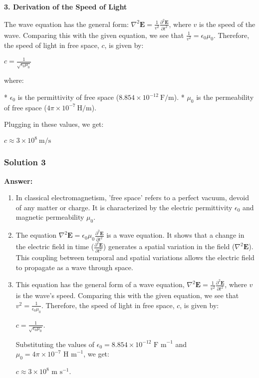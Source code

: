 \documentclass{article}
\begin{document}
\textbf{3. Derivation of the Speed of Light}

The wave equation has the general form: $\nabla^2 \mathbf{E} = \frac{1}{v^2} \frac{\partial^2 \mathbf{E}}{\partial t^2}$, where $v$ is the speed of the wave. Comparing this with the given equation, we see that $\frac{1}{v^2} = \epsilon_0 \mu_0$. Therefore, the speed of light in free space, $c$, is given by:

$c = \frac{1}{\sqrt{\epsilon_0 \mu_0}}$

where:

* $\epsilon_0$ is the permittivity of free space ($8.854 \times 10^{-12} \ \text{F/m}$).
* $\mu_0$ is the permeability of free space ($4\pi \times 10^{-7} \ \text{H/m}$).

Plugging in these values, we get:

$c \approx 3 \times 10^8 \ \text{m/s}$ 


\subsubsection{Solution 3}
\textbf{Answer:}

\begin{enumerate}
\item In classical electromagnetism, 'free space' refers to a perfect vacuum, devoid of any matter or charge. It is characterized by the electric permittivity $\epsilon_0$ and magnetic permeability $\mu_0$.

\item The equation $\nabla^2 \mathbf{E} = \epsilon_0 \mu_0 \frac{\partial^2 \mathbf{E}}{\partial t^2}$ is a wave equation. It shows that a change in the electric field in time ($\frac{\partial^2 \mathbf{E}}{\partial t^2}$) generates a spatial variation in the field ($\nabla^2 \mathbf{E}$). This coupling between temporal and spatial variations allows the electric field to propagate as a wave through space. 

\item  This equation has the general form of a wave equation, $\nabla^2 \mathbf{E} = \frac{1}{v^2} \frac{\partial^2 \mathbf{E}}{\partial t^2}$, where $v$ is the wave's speed.  Comparing this with the given equation, we see that $v^2 = \frac{1}{\epsilon_0 \mu_0}$. Therefore, the speed of light in free space, $c$, is given by:

$c = \frac{1}{\sqrt{\epsilon_0 \mu_0}}$.

Substituting the values of $\epsilon_0 = 8.854 \times 10^{-12} \text{ F m}^{-1}$ and $\mu_0 = 4\pi \times 10^{-7} \text{ H m}^{-1}$, we get:

$c \approx 3 \times 10^8 \text{ m s}^{-1}$. 
\end{enumerate}
\end{document}
